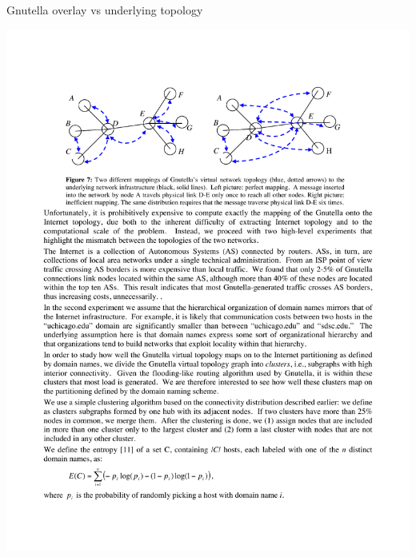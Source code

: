 \begin{frame}{Gnutella overlay vs underlying topology}
	
\includegraphics[width=\textwidth]{figs/10/mapping3}	

\end{frame}

